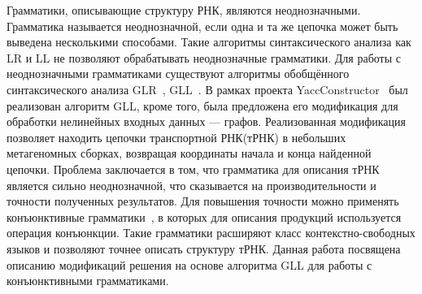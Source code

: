 Грамматики, описывающие структуру РНК, являются неоднозначными. Грамматика называется неоднозначной, если одна и та же цепочка может быть выведена несколькими способами. Такие алгоритмы синтаксического анализа как LR и LL не позволяют обрабатывать неоднозначные грамматики. Для работы с неоднозначными грамматиками существуют алгоритмы обобщённого синтаксического анализа GLR~\cite{GLR}, GLL~\cite{GLL}. В рамках проекта YaccConstructor~\cite{YaccConstructorPage, YaccConstructorPaper} был реализован алгоритм GLL, кроме того, была предложена его модификация для обработки нелинейных входных данных --- графов. Реализованная модификация позволяет находить цепочки транспортной РНК(тРНК) в небольших метагеномных сборках, возвращая координаты начала и конца найденной цепочки. Проблема заключается в том, что грамматика для описания тРНК является сильно неоднозначной, что сказывается на производительности и точности полученных результатов. Для повышения точности можно применять конъюнктивные грамматики~\cite{ConjGrammars}, в которых для описания продукций используется операция конъюнкции. Такие грамматики расширяют класс контекстно-свободных языков и позволяют точнее описать структуру тРНК. Данная работа посвящена описанию модификаций решения на основе алгоритма GLL для работы с конъюнктивными грамматиками.
